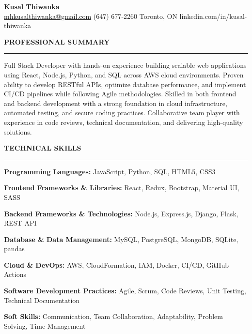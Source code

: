 \documentclass[10pt,letterpaper]{article}
\begin{document}
\begin{center}
{\LARGE\textbf{Kusal Thiwanka}}\\[3pt]
\href{mailto:mhkusalthiwanka@gmail.com}{mhkusalthiwanka@gmail.com}\hspace{2em}%
(647) 677{-}2260\hspace{2em}%
Toronto, ON\hspace{2em}
linkedin.com/in/kusal-thiwanka
\end{center}

\vspace{6pt}

\textbf{PROFESSIONAL SUMMARY}\\[-8pt]
\noindent\rule{\textwidth}{1pt}

\vspace{-2pt}

Full Stack Developer with hands-on experience building scalable web applications using React, Node.js, Python, and SQL across AWS cloud environments. Proven ability to develop RESTful APIs, optimize database performance, and implement CI/CD pipelines while following Agile methodologies. Skilled in both frontend and backend development with a strong foundation in cloud infrastructure, automated testing, and secure coding practices. Collaborative team player with experience in code reviews, technical documentation, and delivering high-quality solutions.

\vspace{8pt}

\textbf{TECHNICAL SKILLS}\\[-8pt]
\noindent\rule{\textwidth}{1pt}

\vspace{-2pt}

\textbf{Programming Languages:} JavaScript, Python, SQL, HTML5, CSS3

\textbf{Frontend Frameworks \& Libraries:} React, Redux, Bootstrap, Material UI, SASS

\textbf{Backend Frameworks \& Technologies:} Node.js, Express.js, Django, Flask, REST API

\textbf{Database \& Data Management:} MySQL, PostgreSQL, MongoDB, SQLite, pandas

\textbf{Cloud \& DevOps:} AWS, CloudFormation, IAM, Docker, CI/CD, GitHub Actions

\textbf{Software Development Practices:} Agile, Scrum, Code Reviews, Unit Testing, Technical Documentation

\textbf{Soft Skills:} Communication, Team Collaboration, Adaptability, Problem Solving, Time Management
\end{document}

